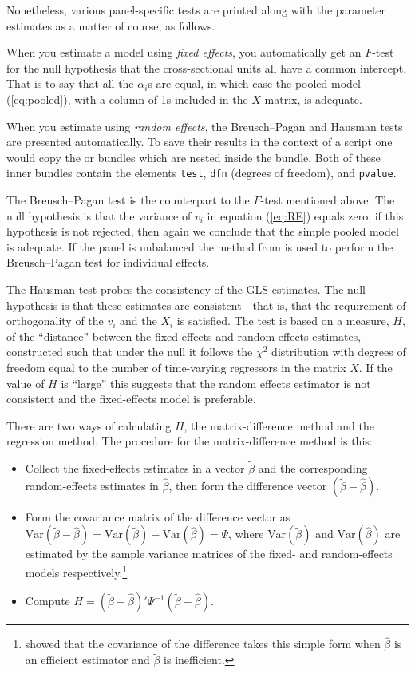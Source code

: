 Nonetheless, various panel-specific tests are printed along with the
parameter estimates as a matter of course, as follows.

When you estimate a model using \textsl{fixed effects}, you
automatically get an $F$-test for the null hypothesis that the
cross-sectional units all have a common intercept.  That is to say
that all the $\alpha_i$s are equal, in which case the pooled model
(\ref{eq:pooled}), with a column of 1s included in the $X$ matrix, is
adequate.

When you estimate using \textsl{random effects}, the Breusch--Pagan
and Hausman tests are presented automatically. To save their results 
in the context of a script one would copy the  
or  bundles which are nested inside the 
 bundle. Both of these inner bundles contain the 
elements \texttt{test}, \texttt{dfn} (degrees of freedom), and 
\texttt{pvalue}.  

The Breusch--Pagan test is the counterpart to the $F$-test mentioned
above.  The null hypothesis is that the variance of $v_i$ in
equation (\ref{eq:RE}) equals zero; if this hypothesis is not 
rejected, then again we conclude that the simple pooled model is 
adequate. If the panel is unbalanced the method from 
\cite{baltagi-li90} is used to perform the Breusch--Pagan test for 
individual effects.

The Hausman test probes the consistency of the GLS estimates.  The
null hypothesis is that these estimates are consistent---that is,
that the requirement of orthogonality of the $v_i$ and the $X_i$ is
satisfied.  The test is based on a measure, $H$, of the ``distance''
between the fixed-effects and random-effects estimates, constructed
such that under the null it follows the $\chi^2$ distribution with
degrees of freedom equal to the number of time-varying regressors in
the matrix $X$.  If the value of $H$ is ``large'' this suggests that
the random effects estimator is not consistent and the fixed-effects
model is preferable.

There are two ways of calculating $H$, the matrix-difference method
and the regression method.  The procedure for the matrix-difference
method is this:
\begin{itemize}
\item Collect the fixed-effects estimates in a vector
  $\tilde{\beta}$ and the corresponding random-effects estimates in
  $\hat{\beta}$, then form the difference vector $(\tilde{\beta} -
  \hat{\beta})$. 
\item Form the covariance matrix of the difference vector as
  $\mbox{Var}(\tilde{\beta} - \hat{\beta}) = \mbox{Var}(\tilde{\beta})
  - \mbox{Var}(\hat{\beta}) = \Psi$, where $\mbox{Var}(\tilde{\beta})$
  and $\mbox{Var}(\hat{\beta})$ are estimated by the sample variance
  matrices of the fixed- and random-effects models
  respectively.\footnote{\cite{hausman78} showed that the covariance of
    the difference takes this simple form when $\hat{\beta}$ is an
    efficient estimator and $\tilde{\beta}$ is inefficient.}
\item Compute $H = \left(\tilde{\beta} - \hat{\beta}\right)' \Psi^{-1}
   \left(\tilde{\beta} - \hat{\beta}\right)$.
\end{itemize}

